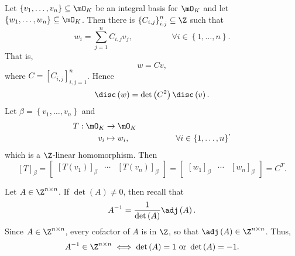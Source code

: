 \documentclass[pmath441]{subfiles}
\begin{document}
    \np Let $\left\lbrace v_1,\ldots,v_n \right\rbrace\subseteq\mO_K$ be an integral basis for $\mO_K$ and let $\left\lbrace w_1,\ldots,w_n \right\rbrace\subseteq\mO_K$. Then there is $\left\lbrace C_{i,j} \right\rbrace^n_{i,j}\subseteq\Z$ such that
    \begin{equation*}
        w_i = \sum^{n}_{j=1}C_{i,j}v_j, \hspace{2cm}\forall i\in\left\lbrace 1,\ldots,n \right\rbrace.
    \end{equation*}
    That is,
    \begin{equation*}
        w = Cv,
    \end{equation*}
    where $C = \left[ C_{i,j} \right]^n_{i,j=1}$. Hence
    \begin{equation*}
        \disc\left( w \right) = \det\left( C^{2} \right)\disc\left( v \right).
    \end{equation*}
    Let $\beta = \left\lbrace v_1,\ldots,v_n \right\rbrace$ and
    \begin{equation*}
        \begin{aligned}
            T:\mO_K&\to\mO_K \\
            v_i&\mapsto w_i, \hspace{2cm}\forall i\in\left\lbrace 1,\ldots,n \right\rbrace
        \end{aligned} ,
    \end{equation*}
    which is a $\Z$-linear homomorphism. Then
    \begin{equation*}
        \left[ T \right]_{\beta} = \begin{bmatrix} \left[ T\left( v_1 \right) \right]_{\beta} & \cdots & \left[ T\left( v_n \right) \right]_{\beta} \end{bmatrix} = \begin{bmatrix} \left[ w_1 \right]_{\beta} & \cdots & \left[ w_n \right]_{\beta} \end{bmatrix} = C^{T}.
    \end{equation*}
    
    \np Let $A\in\Z^{n\times n}$. If $\det\left( A \right)\neq 0$, then recall that
    \begin{equation*}
        A^{-1} = \frac{1}{\det\left( A \right)}\adj\left( A \right).
    \end{equation*}
    Since $A\in\Z^{n\times n}$, every cofactor of $A$ is in $\Z$, so that $\adj\left( A \right)\in\Z^{n\times n}$. Thus,
    \begin{equation*}
        A^{-1}\in\Z^{n\times n}\iff\det\left( A \right) = 1 \text{ or }\det\left( A \right) = -1.
    \end{equation*}
\end{document}
